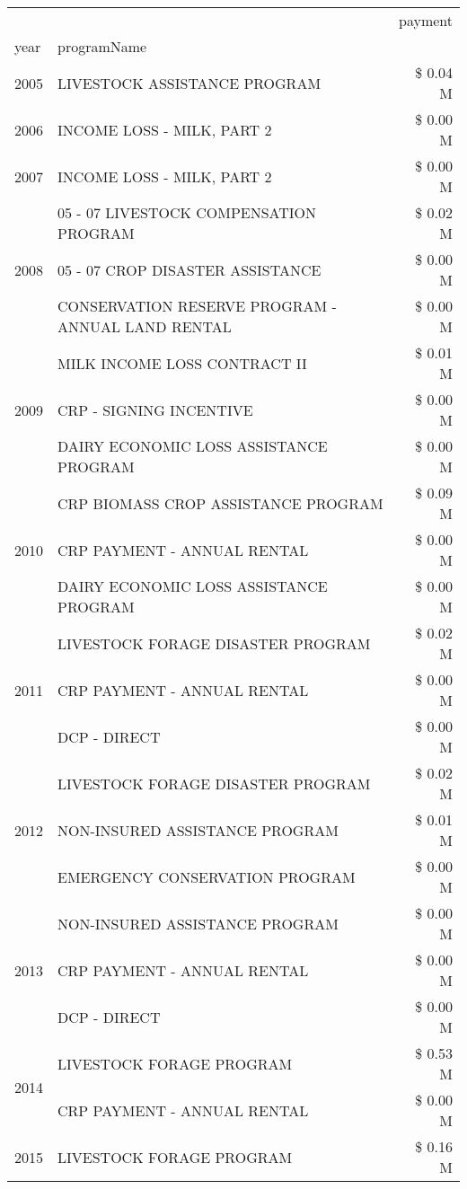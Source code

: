 \begin{tabular}{llr}
\toprule
 &  & payment \\
year & programName &  \\
\midrule
2005 & LIVESTOCK ASSISTANCE PROGRAM & \$ 0.04 M \\
\cline{1-3}
2006 & INCOME LOSS - MILK, PART 2 & \$ 0.00 M \\
\cline{1-3}
2007 & INCOME LOSS - MILK, PART 2 & \$ 0.00 M \\
\cline{1-3}
\multirow[t]{3}{*}{2008} & 05 - 07 LIVESTOCK COMPENSATION PROGRAM & \$ 0.02 M \\
 & 05 - 07 CROP DISASTER ASSISTANCE & \$ 0.00 M \\
 & CONSERVATION RESERVE PROGRAM - ANNUAL LAND RENTAL & \$ 0.00 M \\
\cline{1-3}
\multirow[t]{3}{*}{2009} & MILK INCOME LOSS CONTRACT II & \$ 0.01 M \\
 & CRP - SIGNING INCENTIVE & \$ 0.00 M \\
 & DAIRY ECONOMIC LOSS ASSISTANCE PROGRAM & \$ 0.00 M \\
\cline{1-3}
\multirow[t]{3}{*}{2010} & CRP BIOMASS CROP ASSISTANCE PROGRAM & \$ 0.09 M \\
 & CRP PAYMENT - ANNUAL RENTAL & \$ 0.00 M \\
 & DAIRY ECONOMIC LOSS ASSISTANCE PROGRAM & \$ 0.00 M \\
\cline{1-3}
\multirow[t]{3}{*}{2011} & LIVESTOCK FORAGE DISASTER PROGRAM & \$ 0.02 M \\
 & CRP PAYMENT - ANNUAL RENTAL & \$ 0.00 M \\
 & DCP - DIRECT & \$ 0.00 M \\
\cline{1-3}
\multirow[t]{3}{*}{2012} & LIVESTOCK FORAGE DISASTER PROGRAM & \$ 0.02 M \\
 & NON-INSURED ASSISTANCE PROGRAM & \$ 0.01 M \\
 & EMERGENCY CONSERVATION PROGRAM & \$ 0.00 M \\
\cline{1-3}
\multirow[t]{3}{*}{2013} & NON-INSURED ASSISTANCE PROGRAM & \$ 0.00 M \\
 & CRP PAYMENT - ANNUAL RENTAL & \$ 0.00 M \\
 & DCP - DIRECT & \$ 0.00 M \\
\cline{1-3}
\multirow[t]{2}{*}{2014} & LIVESTOCK FORAGE PROGRAM & \$ 0.53 M \\
 & CRP PAYMENT - ANNUAL RENTAL & \$ 0.00 M \\
\cline{1-3}
\multirow[t]{3}{*}{2015} & LIVESTOCK FORAGE PROGRAM & \$ 0.16 M \\

\end{tabular}
